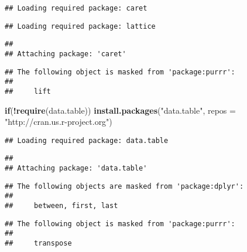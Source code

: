 \documentclass[]{article}
\newenvironment{Shaded}{\begin{snugshade}}{\end{snugshade}}
\newcommand{\ControlFlowTok}[1]{\textcolor[rgb]{0.13,0.29,0.53}{\textbf{#1}}}
\newcommand{\DataTypeTok}[1]{\textcolor[rgb]{0.13,0.29,0.53}{#1}}
\newcommand{\KeywordTok}[1]{\textcolor[rgb]{0.13,0.29,0.53}{\textbf{#1}}}
\newcommand{\NormalTok}[1]{#1}
\newcommand{\OperatorTok}[1]{\textcolor[rgb]{0.81,0.36,0.00}{\textbf{#1}}}
\newcommand{\StringTok}[1]{\textcolor[rgb]{0.31,0.60,0.02}{#1}}
\begin{document}
\begin{verbatim}
## Loading required package: caret
\end{verbatim}

\begin{verbatim}
## Loading required package: lattice
\end{verbatim}

\begin{verbatim}
## 
## Attaching package: 'caret'
\end{verbatim}

\begin{verbatim}
## The following object is masked from 'package:purrr':
## 
##     lift
\end{verbatim}

\begin{Shaded}
\begin{Highlighting}[]
\ControlFlowTok{if}\NormalTok{(}\OperatorTok{!}\KeywordTok{require}\NormalTok{(data.table)) }\KeywordTok{install.packages}\NormalTok{(}\StringTok{"data.table"}\NormalTok{, }\DataTypeTok{repos =} \StringTok{"http://cran.us.r-project.org"}\NormalTok{)}
\end{Highlighting}
\end{Shaded}

\begin{verbatim}
## Loading required package: data.table
\end{verbatim}

\begin{verbatim}
## 
## Attaching package: 'data.table'
\end{verbatim}

\begin{verbatim}
## The following objects are masked from 'package:dplyr':
## 
##     between, first, last
\end{verbatim}

\begin{verbatim}
## The following object is masked from 'package:purrr':
## 
##     transpose
\end{verbatim}
\end{document}
